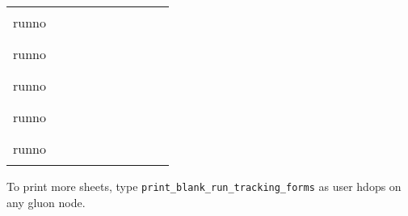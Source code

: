 \documentclass[12pt]{article}
\newcommand{\cbox}{\raisebox{.6ex}{\fbox{\rule{0in}{0.05in}\rule{0.05in}{0in}}}}
\newcommand{\eline}{\rule{0.4in}{0.01in}}
\newcommand{\cmline}{\rule{2.0in}{0.01in}}
\begin{document}
\begin{tabular}{lccccccccc}
runno & \cbox & \cbox & \eline & \eline & \eline & \eline & \eline & \cbox & \cmline \\[0.240in]
runno & \cbox & \cbox & \eline & \eline & \eline & \eline & \eline & \cbox & \cmline \\[0.240in]
runno & \cbox & \cbox & \eline & \eline & \eline & \eline & \eline & \cbox & \cmline \\[0.240in]
runno & \cbox & \cbox & \eline & \eline & \eline & \eline & \eline & \cbox & \cmline \\[0.240in]
runno & \cbox & \cbox & \eline & \eline & \eline & \eline & \eline & \cbox & \cmline
\end{tabular}

\begin{center}
To print more sheets, type {\tt print\_blank\_run\_tracking\_forms} as user hdops on any gluon node.
\end{center}
\end{document}
